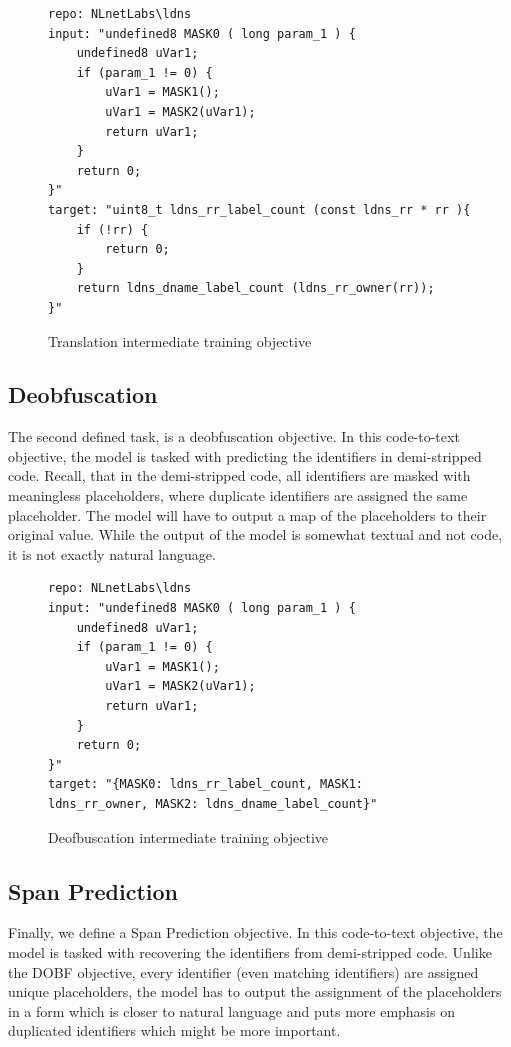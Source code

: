 \label{fig:tanslation}
\begin{figure}[H]
  \centering
\begin{lstlisting}
repo: NLnetLabs\ldns
input: "undefined8 MASK0 ( long param_1 ) { 
    undefined8 uVar1; 
    if (param_1 != 0) { 
        uVar1 = MASK1(); 
        uVar1 = MASK2(uVar1); 
        return uVar1; 
    } 
    return 0; 
}"
target: "uint8_t ldns_rr_label_count (const ldns_rr * rr ){ 
    if (!rr) { 
        return 0;
    } 
    return ldns_dname_label_count (ldns_rr_owner(rr));
}"
\end{lstlisting}
  \caption{Translation intermediate training objective}
\end{figure}

\subsection{Deobfuscation}
The second defined task, is a deobfuscation objective. In this code-to-text objective, the model is tasked with predicting the identifiers in demi-stripped code. Recall, that in the demi-stripped code, all identifiers are masked with meaningless placeholders, where duplicate identifiers are assigned the same placeholder. The model will have to output a map of the placeholders to their original value. While the output of the model is somewhat textual and not code, it is not exactly natural language.

\label{fig:dobf}
\begin{figure}[H]
  \centering
\begin{lstlisting}
repo: NLnetLabs\ldns
input: "undefined8 MASK0 ( long param_1 ) { 
    undefined8 uVar1; 
    if (param_1 != 0) { 
        uVar1 = MASK1(); 
        uVar1 = MASK2(uVar1); 
        return uVar1; 
    } 
    return 0; 
}"
target: "{MASK0: ldns_rr_label_count, MASK1:
ldns_rr_owner, MASK2: ldns_dname_label_count}"
\end{lstlisting}
  \caption{Deofbuscation intermediate training objective}
\end{figure}


\subsection{Span Prediction}
Finally, we define a Span Prediction objective. In this code-to-text objective, the model is tasked with recovering the identifiers from demi-stripped code. Unlike the DOBF objective, every identifier (even matching identifiers) are assigned unique placeholders, the model has to output the assignment of the placeholders in a form which is closer to natural language and puts more emphasis on duplicated identifiers which might be more important.

